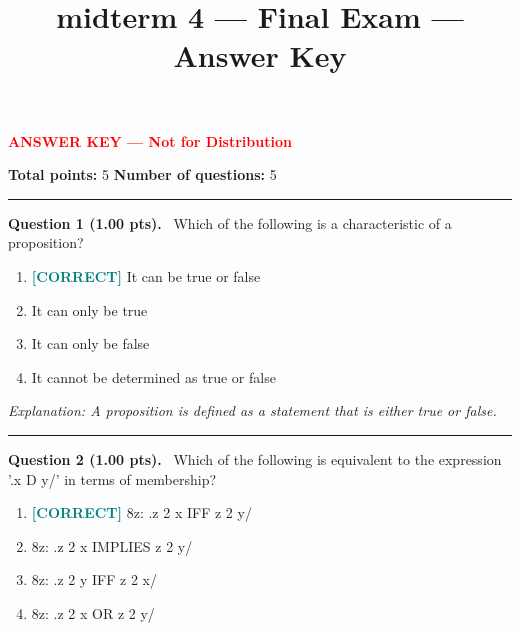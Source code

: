 \documentclass[12pt,a4paper]{article}
\title{midterm 4 — Final Exam --- Answer Key}
\date{}
\begin{document}
\maketitle

{\large \textbf{\textcolor{red}{ANSWER KEY --- Not for Distribution}}}

\vspace{0.5em}



\noindent
\textbf{Total points:} 5
\hfill
\textbf{Number of questions:} 5

\vspace{1em}
\hrule
\vspace{1.5em}


\noindent
\textbf{Question 1 (1.00 pts).}~
Which of the following is a characteristic of a proposition?


\begin{enumerate}[label=\textbf{\Alph*.}]

  \item \textbf{\textcolor{teal}{[CORRECT]}}  It can be true or false

  \item It can only be true

  \item It can only be false

  \item It cannot be determined as true or false

\end{enumerate}



\textit{\small Explanation: A proposition is defined as a statement that is either true or false.}



\vspace{0.8em}
\noindent\rule{\linewidth}{0.2pt}
\vspace{0.3em}


\noindent
\textbf{Question 2 (1.00 pts).}~
Which of the following is equivalent to the expression '.x D y/' in terms of membership?


\begin{enumerate}[label=\textbf{\Alph*.}]

  \item \textbf{\textcolor{teal}{[CORRECT]}}  8z: .z 2 x IFF z 2 y/

  \item 8z: .z 2 x IMPLIES z 2 y/

  \item 8z: .z 2 y IFF z 2 x/

  \item 8z: .z 2 x OR z 2 y/

\end{enumerate}
\end{document}
